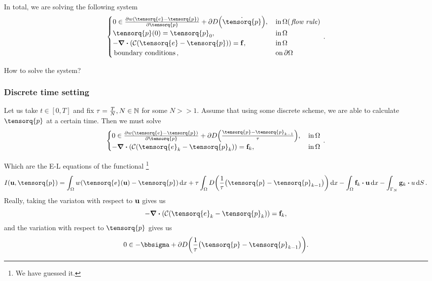 \documentclass[11pt]{scrartcl} %
\begin{document}
In total, we are solving the following system 
\begin{equation*}
    \begin{cases}
	    0 \in \pdv{w\qty(\tensorq{e}-\tensorq{p})}{\tensorq{p}} + \partial D\qty(\dot{\tensorq{p}}), & \, \text{in} \, \Omega (\, \text{\textit{flow rule}}) \, \\
	    \tensorq{p}(0) = \tensorq{p}_0, & \, \text{in} \, \Omega \\
	    - \divergence{\qty(\mathcal{C}\qty(\tensorq{e}-\tensorq{p}))}= \vb{f}, &\, \text{in} \,\Omega \\
	    \, \text{boundary conditions} \,, & \, \text{on} \,\partial \Omega
    \end{cases}.
\end{equation*}

How to solve the system?

\subsubsection{Discrete time setting}
\label{sec:discrete_time}

Let us take $t \in [0, T]$ and fix $\tau = \frac{T}{N}, N \in {\mathbb N}$ for some $N >> 1$. Assume that using some discrete scheme, we are able to calculate $\tensorq{p}$ at a certain time. Then we must solve 
\begin{equation*}
    \begin{cases}
	    0 \in \pdv{w\qty(\tensorq{e}-\tensorq{p})}{\tensorq{p}} + \partial D\qty(\frac{\tensorq{p}-\tensorq{p}_{k-1}}{\tau}), & \, \text{in} \, \Omega \, \\
	    - \divergence{\qty(\mathcal{C}\qty(\tensorq{e}_k-\tensorq{p}_k))}= \vb{f}_k, &\, \text{in} \,\Omega \\
    \end{cases}.
\end{equation*}

Which are the E-L equations of the functional \footnote{We have guessed it.}
\[
	I\qty(\vb{u}, \tensorq{p}) = \int_{\Omega}w\qty(\tensorq{e}\qty(\vb{u})-\tensorq{p})\dd{x} + \tau \int_{\Omega}D\qty(\frac{1}{\tau}\qty(\tensorq{p}-\tensorq{p}_{k-1}))\dd{x} - \int_{\Omega}\vb{f}_k \vdot \vb{u}\dd{x} - \int_{\Gamma_N}\vb{g}_k \vdot u\dd{S}.
\]
Really, taking the variaton with respect to $\vb{u}$ gives us
\[
	- \divergence{\qty(\mathcal{C}\qty(\tensorq{e}_k -\tensorq{p}_k))} = \vb{f}_k,
\]
and the variation with respect to $\tensorq{p}$ gives us
\[
0 \in	- \bbsigma+ \partial D\qty(\frac{1}{\tau}\qty(\tensorq{p}-\tensorq{p}_{k-1})).
\]
\end{document}
